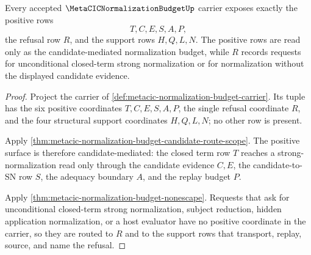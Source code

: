 \begin{theorem}
\label{thm:metacic-normalization-budget-obligation-surface}
Every accepted $\MetaCICNormalizationBudgetUp$ carrier exposes exactly the positive rows
$$
T,C,E,S,A,P,
$$
the refusal row $R$, and the support rows $H,Q,L,N$. The positive rows are read only as the candidate-mediated normalization budget, while $R$ records requests for unconditional closed-term strong normalization or for normalization without the displayed candidate evidence.
\end{theorem}
\begin{proof}
Project the carrier of \autoref{def:metacic-normalization-budget-carrier}. Its tuple has the six positive coordinates $T,C,E,S,A,P$, the single refusal coordinate $R$, and the four structural support coordinates $H,Q,L,N$; no other row is present.

Apply \autoref{thm:metacic-normalization-budget-candidate-route-scope}. The positive surface is therefore candidate-mediated: the closed term row $T$ reaches a strong-normalization read only through the candidate evidence $C,E$, the candidate-to-SN row $S$, the adequacy boundary $A$, and the replay budget $P$.

Apply \autoref{thm:metacic-normalization-budget-nonescape}. Requests that ask for unconditional closed-term strong normalization, subject reduction, hidden application normalization, or a host evaluator have no positive coordinate in the carrier, so they are routed to $R$ and to the support rows that transport, replay, source, and name the refusal.
\end{proof}

